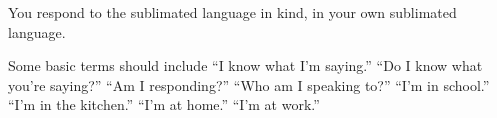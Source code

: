 

You respond to the sublimated language in kind, in your own sublimated
language.  

Some basic terms should include ``I know what I'm saying.''  ``Do I
know what you're saying?''  ``Am I responding?''  ``Who am I speaking
to?''  ``I'm in school.''  ``I'm in the kitchen.''  ``I'm at home.''
``I'm at work.''

\bye
